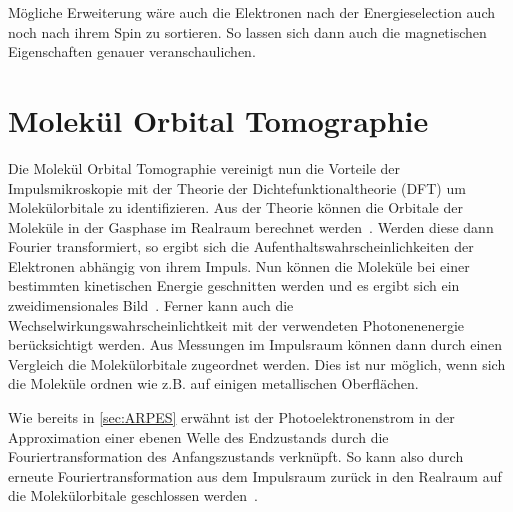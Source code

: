             Mögliche Erweiterung wäre auch die Elektronen nach der Energieselection auch noch nach ihrem Spin zu sortieren.
            So lassen sich dann auch die magnetischen Eigenschaften genauer veranschaulichen.
        
    \section{Molekül Orbital Tomographie} \label{sec:MOT}
        Die Molekül Orbital Tomographie vereinigt nun die Vorteile der Impulsmikroskopie mit der Theorie der Dichtefunktionaltheorie (DFT) um Molekülorbitale zu identifizieren.
        Aus der Theorie können die Orbitale der Moleküle in der Gasphase im Realraum berechnet werden~\cite{database}.
        Werden diese dann Fourier transformiert, so ergibt sich die Aufenthaltswahrscheinlichkeiten der Elektronen abhängig von ihrem Impuls.
        Nun können die Moleküle bei einer bestimmten kinetischen Energie geschnitten werden und es ergibt sich ein zweidimensionales Bild~\cite{brandstetter_kmappy_2021}.
        Ferner kann auch die Wechselwirkungswahrscheinlichtkeit mit der verwendeten Photonenenergie berücksichtigt werden.
        Aus Messungen im Impulsraum können dann durch einen Vergleich die Molekülorbitale zugeordnet werden.
        Dies ist nur möglich, wenn sich die Moleküle ordnen wie z.B. auf einigen metallischen Oberflächen.

        Wie bereits in \autoref{sec:ARPES} erwähnt ist der Photoelektronenstrom in der Approximation einer ebenen Welle des Endzustands durch die Fouriertransformation des Anfangszustands verknüpft.
        So kann also durch erneute Fouriertransformation aus dem Impulsraum zurück in den Realraum auf die Molekülorbitale geschlossen werden~\cite{MM_2}.

